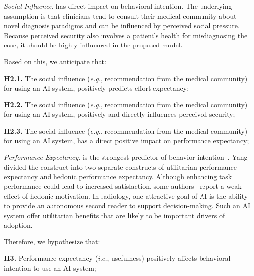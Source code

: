 {\it Social Influence}. has direct impact on behavioral intention.
The underlying assumption is that clinicians tend to consult their medical community about novel diagnosis paradigms and can be influenced by perceived social pressure.
Because perceived security also involves a patient's health for misdiagnosing the case, it should be highly influenced in the proposed model.

\vspace{2.25mm}

\noindent
Based on this, we anticipate that:

\vspace{2.25mm}

\noindent
{\bf H2.1.} The social influence ({\it e.g.}, recommendation from the medical community) for using an AI system, positively predicts effort expectancy;

\vspace{2.25mm}

\noindent
{\bf H2.2.} The social influence ({\it e.g.}, recommendation from the medical community) for using an AI system, positively and directly influences perceived security;

\vspace{2.25mm}

\noindent
{\bf H2.3.} The social influence ({\it e.g.}, recommendation from the medical community) for using an AI system, has a direct positive impact on performance expectancy;

\vspace{2.25mm}

{\it Performance Expectancy}. is the strongest predictor of behavior intention~\cite{KHALILZADEH2017460}.
Yang~\cite{Yang2010} divided the construct into two separate constructs of utilitarian performance expectancy and hedonic performance expectancy.
Although enhancing task performance could lead to increased satisfaction, some authors~\cite{ESCOBARRODRIGUEZ201470, HART201993} report a weak effect of hedonic motivation.
In radiology, one attractive goal of AI is the ability to provide an autonomous second reader to support decision-making.
Such an AI system offer utilitarian benefits that are likely to be important drivers of adoption.

\vspace{2.25mm}

\noindent
Therefore, we hypothesize that:

\vspace{2.25mm}

\noindent
{\bf H3.} Performance expectancy ({\it i.e.}, usefulness) positively affects behavioral intention to use an AI system;

